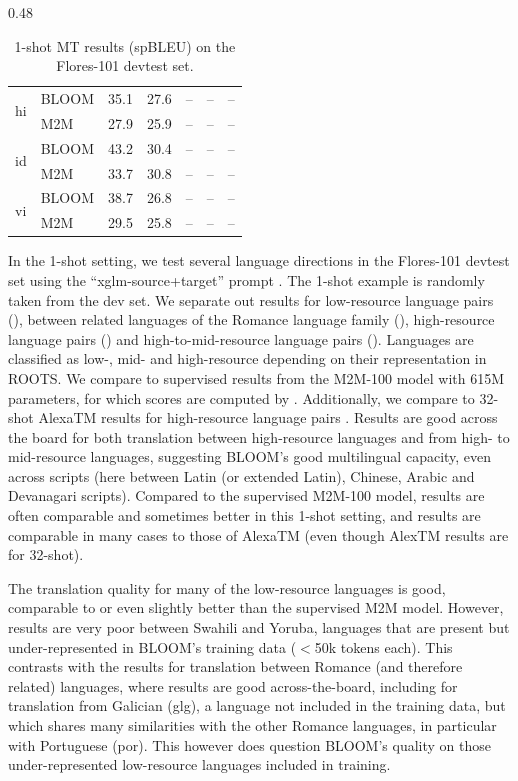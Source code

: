 \documentclass[twoside,11pt]{article}
\begin{document}
\begin{table}[!ht]
\begin{subtable}[b]{0.48\textwidth}
{\begin{tabular}{llrrrrr}
\multirow{2}{*}{hi} & BLOOM & 35.1 & 27.6 & -- & -- & -- \\
 & M2M & 27.9 & 25.9 & -- & -- & -- \\
\midrule
\multirow{2}{*}{id} & BLOOM & 43.2 & 30.4 & -- & -- & -- \\
 & M2M & 33.7 & 30.8 & -- & -- & -- \\
\midrule
\multirow{2}{*}{vi} & BLOOM & 38.7 & 26.8 & -- & -- & -- \\
 & M2M & 29.5 & 25.8 & -- & -- & -- \\
  \bottomrule
\end{tabular}}
\caption{High$\rightarrow$mid-resource language pairs.}
\label{tab:flores101:high-mid}
\end{subtable}
\caption{\label{tab:flores-results}1-shot MT results (spBLEU) on the Flores-101 devtest set. }
\end{table}

In the 1-shot setting, we test several language directions in the Flores-101 \citep{goyal-etal-2022-flores} devtest set using the ``xglm-source+target'' prompt \citep{lin2021xglm}. 
The 1-shot example is randomly taken from the dev set.
We separate out results for low-resource language pairs (), between related languages of the Romance language family (), high-resource language pairs () and high-to-mid-resource language pairs (). 
Languages are classified as low-, mid- and high-resource depending on their representation in ROOTS.
We compare to supervised results from the M2M-100 model \citep{fan-etal-2021-beyond} with 615M parameters, for which scores are computed by \cite{goyal-etal-2022-flores}. Additionally, we compare to 
32-shot AlexaTM results for high-resource language pairs \citep{soltan-etal-2022-alexatm}. 
Results are good across the board for both translation between high-resource languages and from high- to mid-resource languages, suggesting BLOOM's good multilingual capacity, even across scripts (here between Latin (or extended Latin), Chinese, Arabic and Devanagari scripts). Compared to the supervised M2M-100 model, results are often comparable and sometimes better in this 1-shot setting, and results are comparable in many cases to those of AlexaTM (even though AlexTM results are for 32-shot).

The translation quality for many of the low-resource languages is good, comparable to or even slightly better than the supervised M2M model.
However, results are very poor between Swahili and Yoruba, languages that are present but under-represented in BLOOM's training data ($<$50k tokens each). This contrasts with the results for translation between Romance (and therefore related) languages, where results are good across-the-board, including for translation from Galician (glg), a language not included in the training data, but which shares many similarities with the other Romance languages, in particular with Portuguese (por). This however does question BLOOM's quality on those under-represented low-resource languages included in training.
\end{document}
